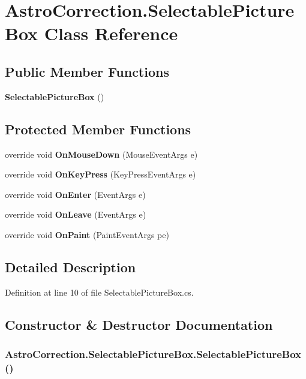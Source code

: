 \section{AstroCorrection.SelectablePictureBox Class Reference}
\label{class_astro_correction_1_1_selectable_picture_box}
\subsection*{Public Member Functions}
\begin{DoxyCompactItemize}
\item 
{\bf SelectablePictureBox} ()
\end{DoxyCompactItemize}
\subsection*{Protected Member Functions}
\begin{DoxyCompactItemize}
\item 
override void {\bf OnMouseDown} (MouseEventArgs e)
\item 
override void {\bf OnKeyPress} (KeyPressEventArgs e)
\item 
override void {\bf OnEnter} (EventArgs e)
\item 
override void {\bf OnLeave} (EventArgs e)
\item 
override void {\bf OnPaint} (PaintEventArgs pe)
\end{DoxyCompactItemize}


\subsection{Detailed Description}


Definition at line 10 of file SelectablePictureBox.cs.

\subsection{Constructor \& Destructor Documentation}
\subsubsection[{SelectablePictureBox}]{\setlength{\rightskip}{0pt plus 5cm}AstroCorrection.SelectablePictureBox.SelectablePictureBox ()}\label{class_astro_correction_1_1_selectable_picture_box_ae14f3d114a9f40b1e74ade813fc8ef0e}


